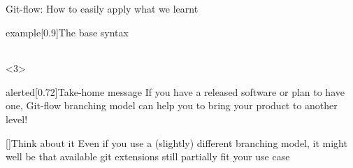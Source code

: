 \documentclass[usenames,svgnames,14pt]{beamer}
\begin{document}
\begin{frame}[fragile,c]{Git-flow: How to easily apply what we learnt}
\begin{overlayarea}{\textwidth}{0.88\textheight}
\begin{onlyenv}
\begin{varblock}{example}[0.9\textwidth]{The base syntax}
\begin{tabular}{r@{\;}l}
                \end{tabular}
            \end{varblock}
        \end{onlyenv}
        \begin{onlyenv}<3>
            \begin{varblock}{alerted}[0.72\textwidth]{Take-home message}
                If you have a released software or plan to have one, Git-flow branching model can help you to bring your product to another level!
            \end{varblock}
            \begin{varblock}{}[\textwidth]{Think about it}
                Even if you use a (slightly) different branching model, it might well be that available git extensions still partially fit your use case
            \end{varblock}
        \end{onlyenv}
    \end{overlayarea}
\end{frame}
\end{document}
